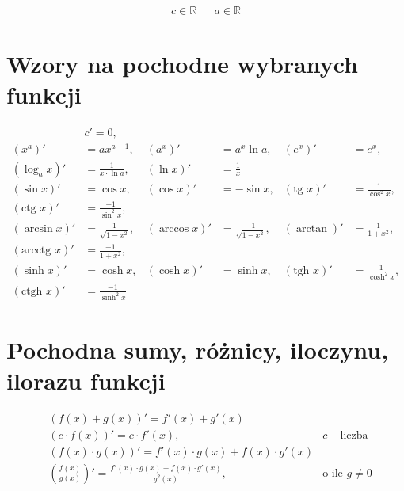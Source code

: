 \documentclass[11pt]{article}
\author{Rafał Grot}
\date{\today}
\title{}
\begin{document}
\begin{align*}
c \in \mathbb{R} && a \in \mathbb{R}
\end{align*}
\section{Wzory na pochodne wybranych funkcji}
\label{sec:org1cb72a2}
\begin{align*}
  & c' = 0,
  \\ \left( x^a \right)' &= a x^{a - 1},
                              & \left( a^{x} \right)' &= a^{x} \ln a ,
                                                      & \left( e^{x} \right)' &= e^{x},
  \\  \left( \log_{a}x \right)'&= \frac{1}{x \cdot \ln a},
                         & \left( \ln x \right)' &= \frac{1}{x}
  \\ \left( \sin x \right)' &= \cos x,
                         &   \left( \cos x \right)' &= - \sin x,
                                                      & \left( \text{tg } x \right)' &= \frac{1}{\cos^{2} x},
  \\ \left( \text{ctg } x  \right)' &= \frac{-1}{\sin^{2} x},
  \\ \left( \arcsin x \right)' &= \frac{1}{\sqrt{1-x^{2}}},
                         & \left( \arccos x \right)' &= \frac{-1}{\sqrt{1-x^{2}}},
                                                      & \left( \arctan \right)' &= \frac{1}{1+x^{2}},
  \\ \left( \text{arcctg } x \right)' &= \frac{-1}{1+x^{2}},
  \\ \left( \sinh x \right)' &= \cosh x,
                         & \left( \cosh x \right)' &= \sinh x,
                                                      & \left( \text{tgh } x \right)' &= \frac{ 1 }{ \cosh^{2} x},
  \\ \left( \text{ctgh } x \right)' &= \frac{-1}{ \sinh^{2} x}
\end{align*}
\section{Pochodna sumy, różnicy, iloczynu, ilorazu funkcji}
\label{sec:org115eab6}
\begin{align*}
  & \left( f(x) + g(x) \right)' = f'(x) + g'(x)\\
  & \left( c \cdot f(x) \right) ' = c \cdot f'(x),& c \text{ -- liczba }\\
  & \left( f(x) \cdot g(x) \right) ' = f'(x) \cdot g(x) + f(x) \cdot g'(x)\\
  & \left( \frac{f(x)}{g(x)} \right) ' = \frac{f'(x) \cdot g(x) - f(x) \cdot g'(x)}{g^{2}(x)}, & \text{o ile } g \neq 0
\end{align*}
\end{document}
